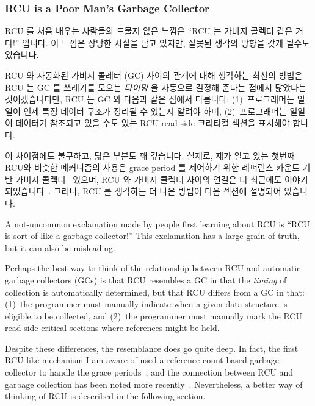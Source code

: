 \fi

\subsubsection{RCU is a Poor Man's Garbage Collector}
\label{sec:defer:RCU is a Poor Man's Garbage Collector}

RCU 를 처음 배우는 사람들의 드물지 않은 느낌은 ``RCU 는 가비지 콜렉터 같은
거다!'' 입니다.
이 느낌은 상당한 사실을 담고 있지만, 잘못된 생각의 방향을 갖게 될수도 있습니다.

RCU 와 자동화된 가비지 콜레터 (GC) 사이의 관계에 대해 생각하는 최선의 방법은
RCU 는 GC 를  쓰레기를 모으는 \emph{타이밍} 을 자동으로 결정해 준다는 점에서
닮았다는 것이겠습니다만, RCU 는 GC 와 다음과 같은 점에서 다릅니다:
(1)~프로그래머는 일일이 언제 특정 데이터 구조가 정리될 수 있는지 알려야 하며,
(2)~프로그래머는 일일이 데이터가 참조되고 있을 수도 있는 RCU read-side 크리티컬
섹션을 표시해야 합니다.

이 차이점에도 불구하고, 닮은 부분도 꽤 깊습니다.
실제로, 제가 알고 있는 첫번째 RCU와 비슷한 메커니즘의 사용은 grace period 를
제어하기 위한 레퍼런스 카운트 기반 가비지 콜렉터~\cite{Kung80} 였으며, RCU 와
가비지 콜렉터 사이의 연결은 더 최근에도 이야기
되었습니다~\cite{HarshalSheth2016goRCU}.
그러나, RCU 를 생각하는 더 나은 방법이 다음 섹션에 설명되어 있습니다.

\iffalse

A not-uncommon exclamation made by people first learning about
RCU is ``RCU is sort of like a garbage collector!''
This exclamation has a large grain of truth, but it can also be
misleading.

Perhaps the best way to think of the relationship between RCU
and automatic garbage collectors (GCs) is that RCU resembles
a GC in that the \emph{timing} of collection is automatically
determined, but that RCU differs from a GC in that: (1)~the programmer
must manually indicate when a given data structure is eligible
to be collected, and (2)~the programmer must manually mark the
RCU read-side critical sections where references might be held.

Despite these differences, the resemblance does go quite deep.
In fact, the first RCU-like mechanism I am aware of used a
reference-count-based garbage collector to handle the grace
periods~\cite{Kung80}, and the connection between RCU and
garbage collection has been noted more
recently~\cite{HarshalSheth2016goRCU}.
Nevertheless, a better way of thinking of RCU is described in the
following section.


